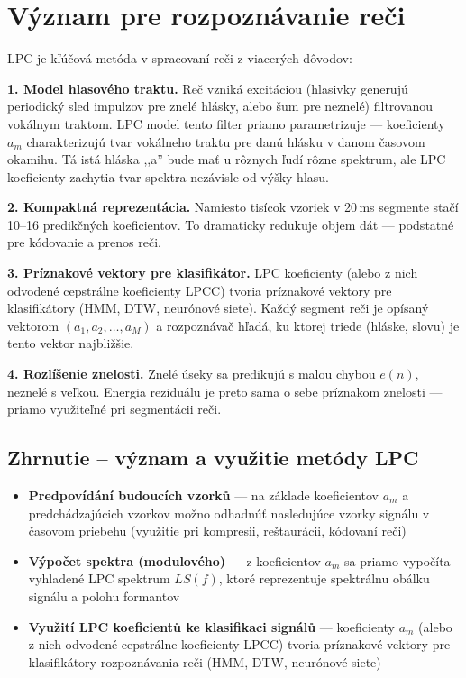 \section{Význam pre rozpoznávanie reči}

LPC je kľúčová metóda v spracovaní reči z viacerých dôvodov:

\textbf{1. Model hlasového traktu.} Reč vzniká excitáciou (hlasivky
generujú periodický sled impulzov pre znelé hlásky, alebo šum pre neznelé)
filtrovanou vokálnym traktom. LPC model tento filter priamo parametrizuje
--- koeficienty $a_m$ charakterizujú tvar vokálneho traktu pre danú hlásku
v danom časovom okamihu. Tá istá hláska ,,a'' bude mať u rôznych ľudí rôzne
spektrum, ale LPC koeficienty zachytia tvar spektra nezávisle od výšky
hlasu.

\textbf{2. Kompaktná reprezentácia.} Namiesto tisícok vzoriek v 20\,ms
segmente stačí 10--16 predikčných koeficientov. To dramaticky redukuje objem
dát --- podstatné pre kódovanie a prenos reči.

\textbf{3. Príznakové vektory pre klasifikátor.} LPC koeficienty (alebo
z nich odvodené cepstrálne koeficienty LPCC) tvoria príznakové vektory pre
klasifikátory (HMM, DTW, neurónové siete). Každý segment reči je opísaný
vektorom $(a_1, a_2, \ldots, a_M)$ a rozpoznávač hľadá, ku ktorej triede
(hláske, slovu) je tento vektor najbližšie.

\textbf{4. Rozlíšenie znelosti.} Znelé úseky sa predikujú s malou chybou
$e(n)$, neznelé s veľkou. Energia reziduálu je preto sama o sebe príznakom
znelosti --- priamo využiteľné pri segmentácii reči.


\subsection*{Zhrnutie -- význam a využitie metódy LPC}

\begin{itemize}
  \item \textbf{Predpovídání budoucích vzorků} --- na základe koeficientov $a_m$
        a predchádzajúcich vzorkov možno odhadnúť nasledujúce vzorky signálu
        v časovom priebehu (využitie pri kompresii, reštaurácii, kódovaní reči)
  \item \textbf{Výpočet spektra (modulového)} --- z koeficientov $a_m$ sa
        priamo vypočíta vyhladené LPC spektrum $LS(f)$, ktoré reprezentuje
        spektrálnu obálku signálu a polohu formantov
  \item \textbf{Využití LPC koeficientů ke klasifikaci signálů} --- koeficienty
        $a_m$ (alebo z nich odvodené cepstrálne koeficienty LPCC) tvoria
        príznakové vektory pre klasifikátory rozpoznávania reči (HMM, DTW,
        neurónové siete)
\end{itemize}

%